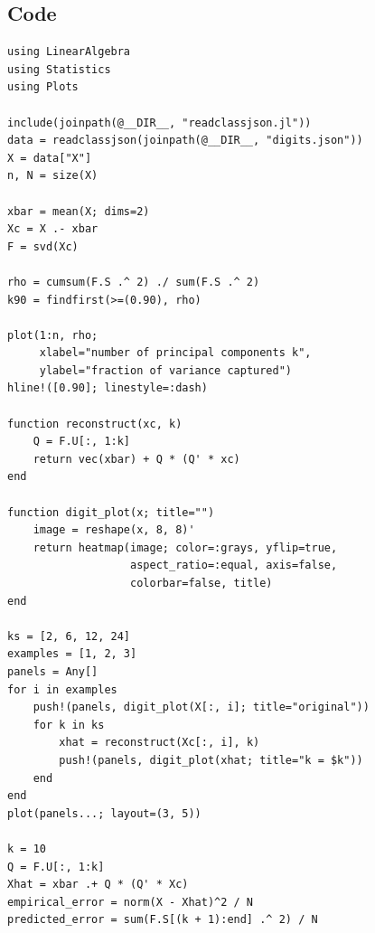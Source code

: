 \subsection{Code}
\begin{lstlisting}[language={},basicstyle=\ttfamily\footnotesize]
using LinearAlgebra
using Statistics
using Plots

include(joinpath(@__DIR__, "readclassjson.jl"))
data = readclassjson(joinpath(@__DIR__, "digits.json"))
X = data["X"]
n, N = size(X)

xbar = mean(X; dims=2)
Xc = X .- xbar
F = svd(Xc)

rho = cumsum(F.S .^ 2) ./ sum(F.S .^ 2)
k90 = findfirst(>=(0.90), rho)

plot(1:n, rho;
     xlabel="number of principal components k",
     ylabel="fraction of variance captured")
hline!([0.90]; linestyle=:dash)

function reconstruct(xc, k)
    Q = F.U[:, 1:k]
    return vec(xbar) + Q * (Q' * xc)
end

function digit_plot(x; title="")
    image = reshape(x, 8, 8)'
    return heatmap(image; color=:grays, yflip=true,
                   aspect_ratio=:equal, axis=false,
                   colorbar=false, title)
end

ks = [2, 6, 12, 24]
examples = [1, 2, 3]
panels = Any[]
for i in examples
    push!(panels, digit_plot(X[:, i]; title="original"))
    for k in ks
        xhat = reconstruct(Xc[:, i], k)
        push!(panels, digit_plot(xhat; title="k = $k"))
    end
end
plot(panels...; layout=(3, 5))

k = 10
Q = F.U[:, 1:k]
Xhat = xbar .+ Q * (Q' * Xc)
empirical_error = norm(X - Xhat)^2 / N
predicted_error = sum(F.S[(k + 1):end] .^ 2) / N
\end{lstlisting}
